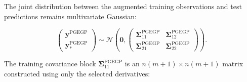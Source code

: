 \documentclass[12pt]{article}
\begin{document}
The joint distribution between the augmented training observations and test predictions remains multivariate Gaussian:

\begin{equation}
	\label{eqn:pgegp_joint_dist}
	\begin{pmatrix}
		\mathbf{y}^{\text{PGEGP}} \\
		\mathbf{y}^{\text{PGEGP}}_*
	\end{pmatrix}
	\sim \mathcal{N}\left(
	\mathbf{0},
	\begin{pmatrix}
		\boldsymbol{\Sigma}^{\text{PGEGP}}_{11} & \boldsymbol{\Sigma}^{\text{PGEGP}}_{12} \\
		\boldsymbol{\Sigma}^{\text{PGEGP}}_{21} & \boldsymbol{\Sigma}^{\text{PGEGP}}_{22}
	\end{pmatrix}
	\right).
\end{equation}

The training covariance block $\boldsymbol{\Sigma}^{\text{PGEGP}}_{11}$ is an $n(m+1) \times n(m+1)$ matrix constructed using only the selected derivatives:
\end{document}
